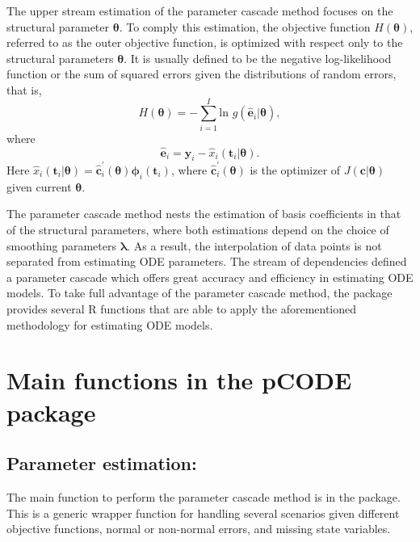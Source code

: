The upper stream estimation of the parameter cascade method focuses on the structural parameter $\bm{\theta}$. To comply this estimation, the objective function $H(\bm{\theta})$, referred to as the outer objective function, is optimized with respect only to the structural parameters $\bm{\theta}$. It is usually defined to be the negative log-likelihood function or the sum of squared errors given the distributions of random errors, that is,
\begin{equation}
H(\bm{\theta}) = -\sum_{i=1}^{I}\text{ln }g(\widehat{\bm{e}}_{i}|\bm{\theta}),
\label{eq:outterobj}
\end{equation}
where
\begin{equation*}
\widehat{\bm{e}}_{i} = \bm{y}_{i} - \hat{x}_i(\bm{t}_{i}|\bm{\theta}).
\end{equation*}
Here $\hat{x}_i(\bm{t}_{i}|\bm{\theta}) = \hat{\bm{c}}^{\prime}_{i}(\bm{\theta})\bm{\phi}_{i}(\bm{t}_{i})$, where $\hat{\bm{c}}^{\prime}_{i}(\bm{\theta})$ is the optimizer of $J(\bm{c}|\bm{\theta})$ given current $\bm{\theta}$. 

The parameter cascade method nests the estimation of basis coefficients in that of the structural parameters, where both estimations depend on the choice of smoothing parameters $\bm{\lambda}$. As a result, the interpolation of data points is not separated from estimating ODE parameters. The stream of dependencies defined a parameter cascade which offers great accuracy and efficiency in estimating ODE models. To take full advantage of the parameter cascade method, the  package provides several R functions that are able to apply the aforementioned methodology for estimating ODE models. 



\section{Main functions in the pCODE package } \label{seq:functions}
\subsection[pcode]{Parameter estimation: }
The main function to perform the parameter cascade method is  in the package. This is a generic wrapper function for handling several scenarios given different objective functions, normal or non-normal errors, and missing state variables. 


